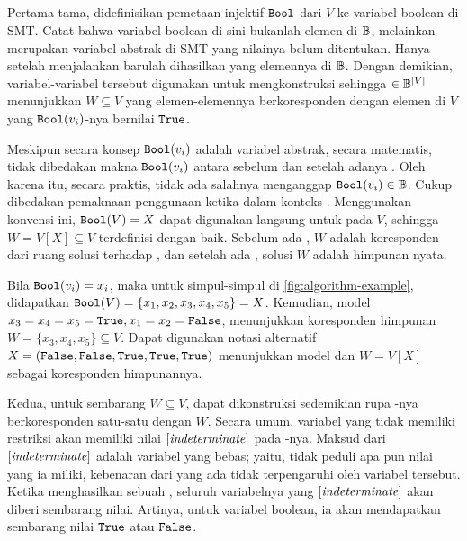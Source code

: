 \subsection{}
\label{subsec:bs}

Pertama-tama, didefinisikan pemetaan injektif \(\boolmap\) dari \(V\) ke variabel boolean di SMT. Catat bahwa variabel boolean di sini bukanlah elemen di \(\Bbb\), melainkan merupakan variabel abstrak di SMT yang nilainya belum ditentukan. Hanya setelah menjalankan  barulah dihasilkan  yang elemennya di \(\Bbb\). Dengan demikian, variabel-variabel tersebut digunakan untuk mengkonstruksi  sehingga  \(\in \Bbb^{|V|}\) menunjukkan \(W \subseteq V\) yang elemen-elemennya berkoresponden dengan elemen di \(V\) yang \(\boolmap(v_i)\)-nya bernilai \(\True\).

Meskipun secara konsep \(\boolmap(v_i)\) adalah variabel abstrak, secara matematis, tidak dibedakan makna \(\boolmap(v_i)\) antara sebelum dan setelah adanya . Oleh karena itu, secara praktis, tidak ada salahnya menganggap \(\boolmap(v_i) \in \Bbb\). Cukup dibedakan pemaknaan penggunaan ketika dalam konteks . Menggunakan konvensi ini, \(\boolmap(V) = X\) dapat digunakan langsung untuk  pada \(V\), sehingga \(W = V[X] \subseteq V\) terdefinisi dengan baik. Sebelum ada , \(W\) adalah koresponden dari ruang solusi terhadap , dan setelah ada , solusi \(W\) adalah himpunan nyata.

\begin{example}
	Bila \(\boolmap(v_i) = x_i\), maka untuk simpul-simpul di \autoref{fig:algorithm-example}, didapatkan \(\boolmap(V) = \{x_1, x_2, x_3, x_4, x_5\} = X\). Kemudian, model \(x_3 = x_4 = x_5 = \True, x_1 = x_2 = \False\), menunjukkan koresponden himpunan \(W = \{x_3, x_4, x_5\} \subseteq V\). Dapat digunakan notasi alternatif \(X = (\False, \False, \True, \True, \True)\) menunjukkan model dan \(W = V[X]\) sebagai koresponden himpunannya.
\end{example}

Kedua, untuk sembarang \(W \subseteq V\), dapat dikonstruksi  sedemikian rupa -nya berkoresponden satu-satu dengan \(W\). Secara umum, variabel yang tidak memiliki restriksi akan memiliki nilai \(\indeterminate\) pada -nya. Maksud dari \(\indeterminate\) adalah variabel yang bebas; yaitu, tidak peduli apa pun nilai yang ia miliki, kebenaran dari  yang ada tidak terpengaruhi oleh variabel tersebut. Ketika  menghasilkan sebuah , seluruh variabelnya yang \(\indeterminate\) akan diberi sembarang nilai. Artinya, untuk variabel boolean, ia akan mendapatkan sembarang nilai \(\True\) atau \(\False\).

